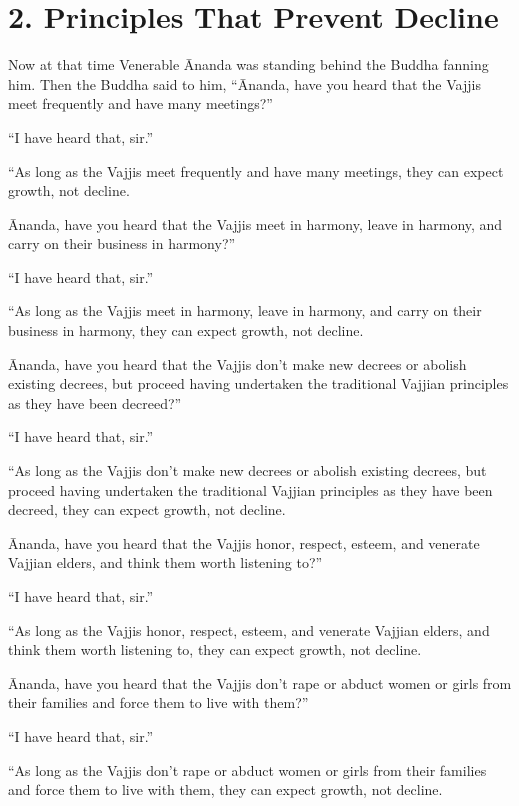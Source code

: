 \documentclass[12pt,openany]{book}%
\begin{document}
\section*{2. Principles That Prevent Decline }

Now at that time Venerable Ānanda was standing behind the Buddha fanning him. Then the Buddha said to him, “Ānanda, have you heard that the Vajjis meet frequently and have many meetings?” 

“I have heard that, sir.” 

“As long as the Vajjis meet frequently and have many meetings, they can expect growth, not decline. 

Ānanda, have you heard that the Vajjis meet in harmony, leave in harmony, and carry on their business in harmony?” 

“I have heard that, sir.” 

“As long as the Vajjis meet in harmony, leave in harmony, and carry on their business in harmony, they can expect growth, not decline. 

Ānanda, have you heard that the Vajjis don’t make new decrees or abolish existing decrees, but proceed having undertaken the traditional Vajjian principles as they have been decreed?” 

“I have heard that, sir.” 

“As long as the Vajjis don’t make new decrees or abolish existing decrees, but proceed having undertaken the traditional Vajjian principles as they have been decreed, they can expect growth, not decline. 

Ānanda, have you heard that the Vajjis honor, respect, esteem, and venerate Vajjian elders, and think them worth listening to?” 

“I have heard that, sir.” 

“As long as the Vajjis honor, respect, esteem, and venerate Vajjian elders, and think them worth listening to, they can expect growth, not decline. 

Ānanda, have you heard that the Vajjis don’t rape or abduct women or girls from their families and force them to live with them?” 

“I have heard that, sir.” 

“As long as the Vajjis don’t rape or abduct women or girls from their families and force them to live with them, they can expect growth, not decline. 
\end{document}
